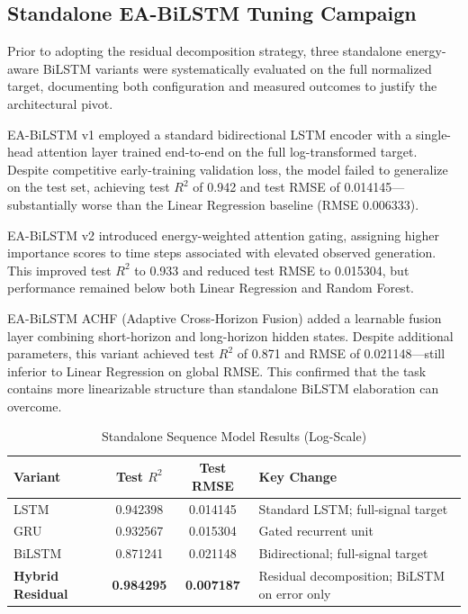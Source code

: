 \documentclass{ieeeaccess}
\begin{document}
\subsection{Standalone EA-BiLSTM Tuning Campaign}
Prior to adopting the residual decomposition strategy, three standalone energy-aware BiLSTM variants were systematically evaluated on the full normalized target, documenting both configuration and measured outcomes to justify the architectural pivot.

EA-BiLSTM v1 employed a standard bidirectional LSTM encoder with a single-head attention layer trained end-to-end on the full log-transformed target. Despite competitive early-training validation loss, the model failed to generalize on the test set, achieving test $R^2$ of 0.942 and test RMSE of 0.014145---substantially worse than the Linear Regression baseline (RMSE 0.006333).

EA-BiLSTM v2 introduced energy-weighted attention gating, assigning higher importance scores to time steps associated with elevated observed generation. This improved test $R^2$ to 0.933 and reduced test RMSE to 0.015304, but performance remained below both Linear Regression and Random Forest.

EA-BiLSTM ACHF (Adaptive Cross-Horizon Fusion) added a learnable fusion layer combining short-horizon and long-horizon hidden states. Despite additional parameters, this variant achieved test $R^2$ of 0.871 and RMSE of 0.021148---still inferior to Linear Regression on global RMSE. This confirmed that the task contains more linearizable structure than standalone BiLSTM elaboration can overcome.

\begin{table}[!t]
\caption{Standalone Sequence Model Results (Log-Scale)}
\label{tab:standalone}
\centering
\begin{tabular}{lccp{3.5cm}}
\toprule
Variant & Test $R^2$ & Test RMSE & Key Change \\
\midrule
LSTM & 0.942398 & 0.014145 & Standard LSTM; full-signal target \\
GRU & 0.932567 & 0.015304 & Gated recurrent unit \\
BiLSTM & 0.871241 & 0.021148 & Bidirectional; full-signal target \\
\textbf{Hybrid Residual} & \textbf{0.984295} & \textbf{0.007187} & Residual decomposition; BiLSTM on error only \\
\bottomrule
\end{tabular}
\end{table}
\end{document}
